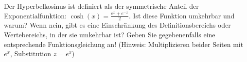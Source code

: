 \item Der Hyperbelkosinus ist definiert als der symmetrische Anteil der Exponentialfunktion: $\cosh(x) = \frac{e^x+e^{-x}}{2}$. Ist diese Funktion umkehrbar und warum? Wenn nein, gibt es eine Einschränkung des Definitionsbereichs oder Wertebereichs, in der sie umkehrbar ist? Geben Sie gegebenenfalls eine entsprechende Funktionsgleichung an! (Hinweis: Multiplizieren beider Seiten mit $e^x$, Substitution $z=e^x$)